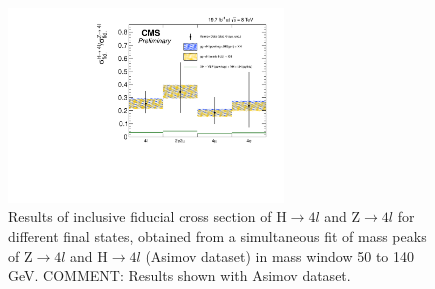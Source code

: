 \begin{figure}[!h!tb]
  \begin{center}
      \includegraphics[width=0.65\textwidth,angle=0]{Appendix/Plots/ratio_Ratio_SM_125_mass4l_Asimov_floatPOIs_fixMH_fixDeltaMHmZ_all_8TeV_xs_v1_v2.pdf}
    \caption{Results of inclusive fiducial cross section of H$\rightarrow 4l$ and Z$\rightarrow 4l$ for different final states, obtained
from a simultaneous fit of mass peaks of Z$\rightarrow 4l$ and H$\rightarrow 4l$ (Asimov dataset) in mass window 50 to 140 GeV.
    COMMENT: Results shown with Asimov dataset.
} 
  \label{fig:inclusive-results-simfit-asimov}
 \end{center}
\end{figure}

